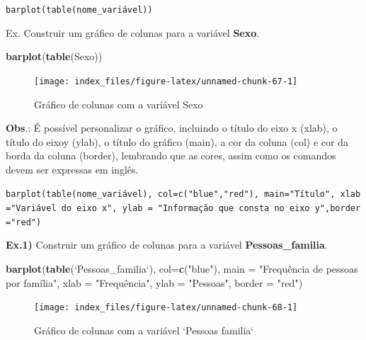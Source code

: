 \documentclass[12pt,portuguese,oneside]{book}
\newenvironment{Shaded}{\begin{snugshade}}{\end{snugshade}}
\newcommand{\KeywordTok}[1]{\textcolor[rgb]{0.13,0.29,0.53}{\textbf{#1}}}
\newcommand{\DataTypeTok}[1]{\textcolor[rgb]{0.13,0.29,0.53}{#1}}
\newcommand{\StringTok}[1]{\textcolor[rgb]{0.31,0.60,0.02}{#1}}
\newcommand{\NormalTok}[1]{#1}
\begin{document}
\texttt{barplot(table(nome\_variável))}

Ex. Construir um gráfico de colunas para a variável \textbf{Sexo}.

\begin{Shaded}
\begin{Highlighting}[]
\KeywordTok{barplot}\NormalTok{(}\KeywordTok{table}\NormalTok{(Sexo))}
\end{Highlighting}
\end{Shaded}

\begin{figure}[H]

{\centering \texttt{[image: index\_files/figure-latex/unnamed-chunk-67-1]} 

}

\caption{Gráfico de colunas com a variável Sexo}\label{fig:unnamed-chunk-67}
\end{figure}

\textbf{Obs}.: É possível personalizar o gráfico, incluindo o título do
eixo x (xlab), o título do eixoy (ylab), o título do gráfico (main), a
cor da coluna (col) e cor da borda da coluna (border), lembrando que as
cores, assim como os comandos devem ser expressas em inglês.

\texttt{barplot(table(nome\_variável),\ col=c("blue","red"),\ main="Título",\ xlab="Variável\ do\ eixo\ x",\ ylab\ =\ "Informação\ que\ consta\ no\ eixo\ y",border="red")}

\textbf{Ex.1)} Construir um gráfico de colunas para a variável
\textbf{Pessoas\_familia}.

\begin{Shaded}
\begin{Highlighting}[]
\KeywordTok{barplot}\NormalTok{(}\KeywordTok{table}\NormalTok{(}\StringTok{`}\DataTypeTok{Pessoas_familia}\StringTok{`}\NormalTok{), }\DataTypeTok{col=}\KeywordTok{c}\NormalTok{(}\StringTok{"blue"}\NormalTok{), }
        \DataTypeTok{main =} \StringTok{"Frequência de pessoas por família"}\NormalTok{, }
        \DataTypeTok{xlab =} \StringTok{"Frequência", }
\StringTok{        ylab = "}\NormalTok{Pessoas}\StringTok{", }
\StringTok{        border = "}\NormalTok{red}\StringTok{")}
\end{Highlighting}
\end{Shaded}

\begin{figure}[H]

{\centering \texttt{[image: index\_files/figure-latex/unnamed-chunk-68-1]} 

}

\caption{Gráfico de colunas com a variável `Pessoas familia`}\label{fig:unnamed-chunk-68}
\end{figure}
\end{document}
